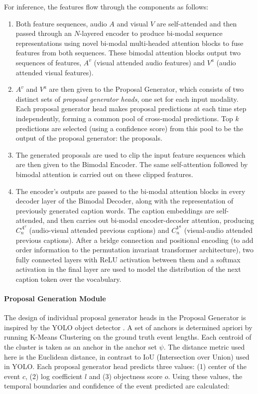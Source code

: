 For inference, the features flow through the components as follows:
\begin{enumerate}
\item Both feature sequences, audio $A$ and visual $V$ are self-attended and then passed
through an $N$-layered encoder to produce bi-modal sequence representations using novel
bi-modal multi-headed attention blocks to fuse features from both sequences. These bimodal
attention blocks output two sequences of features, $A^v$ (visual attended audio features)
and $V^a$ (audio attended visual features).

\item $A^v$ and $V^a$ are then given to the Proposal Generator, which consists of two
distinct sets of \textit{proposal generator heads}, one set for each input modality.
Each proposal generator head makes proposal predictions at each time step independently,
forming a common pool of cross-modal predictions. Top $k$ predictions are selected (using a
confidence score) from this pool to be the output of the proposal generator: the proposals.

\item The generated proposals are used to clip the input feature sequences which are then
given to the Bimodal Encoder. The same self-attention followed by bimodal attention is
carried out on these clipped features.

\item The encoder's outputs are passed to the bi-modal attention blocks in every decoder
layer of the Bimodal Decoder, along with the representation of previously generated caption
words. The caption embeddings are self-attended, and then carries out bi-modal
encoder-decoder attention, producing $C_n^{A^v}$ (audio-visual attended previous captions)
and $C_n^{V^a}$ (visual-audio attended previous captions). After a bridge connection and
positional encoding (to add order information to the permutation invariant transformer
architecture), two fully connected layers with ReLU activation between them and a softmax
activation in the final layer are used to model the distribution of the next caption token 
over the vocabulary.

\end{enumerate}

\paragraph{Proposal Generation Module}


\par The design of individual proposal generator heads in the Proposal Generator is inspired by 
the YOLO object detector \cite{yolo}. A set of anchors is determined apriori by running 
K-Means Clustering on the ground truth event lengths. Each centroid of the cluster is taken 
as an anchor in the anchor set $\psi$. The distance metric used here is the Euclidean 
distance, in contrast to IoU (Intersection over Union) used in YOLO. Each proposal generator 
head predicts three values: (1) center of the event $c$, (2) log coefficient $l$ and (3) 
objectness score $o$. Using these values, the temporal boundaries and confidence of the event 
predicted are calculated:

